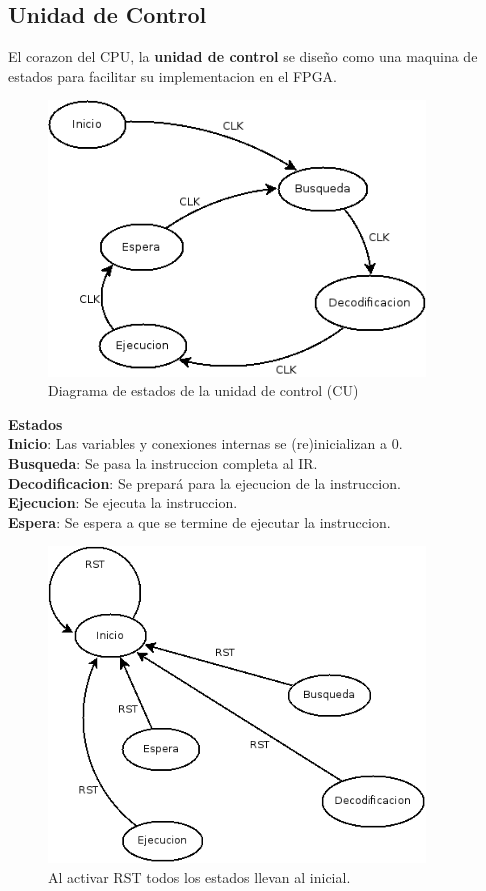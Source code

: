 \documentclass[11pt,letterpaper]{article} %
\begin{document}
\subsection{Unidad de Control}
El corazon del CPU, la \textbf{unidad de control} se diseño como una maquina de
estados para facilitar su implementacion en el FPGA.
\begin{figure}[H]
  \centering
  \includegraphics[width=10cm]{figures/cpu_estados.png}
  \caption{Diagrama de estados de la unidad de control (CU)}
\end{figure}
\textbf{Estados}\\
\textbf{Inicio}: Las variables y conexiones internas se (re)inicializan a 0. \\
\textbf{Busqueda}: Se pasa la instruccion completa al IR.\\
\textbf{Decodificacion}: Se prepará para la ejecucion de la instruccion. \\
\textbf{Ejecucion}: Se ejecuta la instruccion. \\
\textbf{Espera}: Se espera a que se termine de ejecutar la instruccion. \\
\begin{figure}[H]
  \centering
  \includegraphics[width=10cm]{figures/cpu_rst.png}
  \caption{Al activar RST todos los estados llevan al inicial.}
\end{figure}
\end{document}
